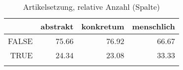 \begin{table}[ht]
\centering
\begin{tabular}{rrrr}
  \lsptoprule
 & abstrakt & konkretum & menschlich \\ 
  \midrule
FALSE & 75.66 & 76.92 & 66.67 \\ 
  TRUE & 24.34 & 23.08 & 33.33 \\ 
   \lspbottomrule
\end{tabular}
\caption{Artikelsetzung, relative Anzahl (Spalte)} 
\end{table}
